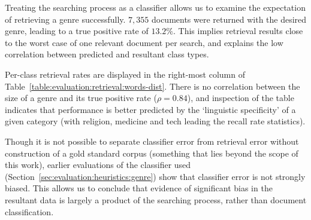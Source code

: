 
Treating the searching process as a classifier allows us to examine the expectation of retrieving a genre successfully.  $7,355$ documents were returned with the desired genre, leading to a true positive rate of $13.2\%$.  This implies retrieval results close to the worst case of one relevant document per search, and explains the low correlation between predicted and resultant class types.

Per-class retrieval rates are displayed in the right-most column of Table~\ref{table:evaluation:retrieval:words-dist}.  There is no correlation between the size of a genre and its true positive rate ($\rho = 0.84$), and inspection of the table indicates that performance is better predicted by the `linguistic specificity' of a given category (with religion, medicine and tech leading the recall rate statistics).

Though it is not possible to separate classifier error from retrieval error without construction of a gold standard corpus (something that lies beyond the scope of this work), earlier evaluations of the classifier used (Section~\ref{sec:evaluation:heuristics:genre}) show that classifier error is not strongly biased.  This allows us to conclude that evidence of significant bias in the resultant data is largely a product of the searching process, rather than document classification.





